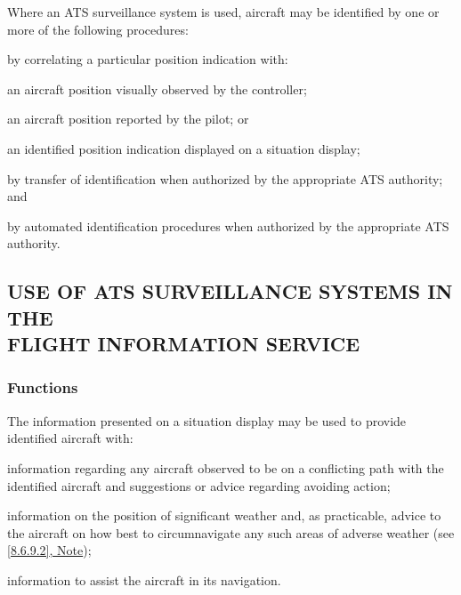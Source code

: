 \begin{enumeratesc}
    \begin{enumempty}
        \item Where an ATS surveillance system is used, aircraft may be identified by one or more of the following procedures:
    \end{enumempty}
    \begin{enumalph}
        \item by correlating a particular position indication with:     
        \begin{enumroman}
            \item an aircraft position visually observed by the controller;
            \item an aircraft position reported by the pilot; or
            \item an identified position indication displayed on a situation display;
        \end{enumroman}
        \item by transfer of identification when authorized by the appropriate ATS authority; and
        \item by automated identification procedures when authorized by the appropriate ATS authority.
    \end{enumalph}
\end{enumeratesc}

\subsection[Use of ATS surveillance systems in the flight information service]{USE OF ATS SURVEILLANCE SYSTEMS IN THE \\ FLIGHT INFORMATION SERVICE}


\subsubsection{Functions}

The information presented on a situation display may be used to provide identified aircraft with:
\begin{enumalph}
    \item information regarding any aircraft observed to be on a conflicting path with the identified aircraft and suggestions or advice regarding avoiding action;
    \item information on the position of significant weather and, as practicable, advice to the aircraft on how best to circumnavigate any such areas of adverse weather (see \hyperref[8.6.9.2]{\ref{8.6.9.2}, Note});
    \item information to assist the aircraft in its navigation.
\end{enumalph}

\chapterend